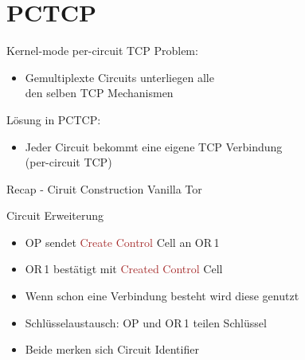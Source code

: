 \documentclass{beamer}
\begin{document}
\section{PCTCP}


\begin{frame}{Kernel-mode per-circuit TCP}{\secname}
  Problem:
  \begin{itemize}
    \item Gemultiplexte Circuits unterliegen alle\\ den selben TCP Mechanismen
  \end{itemize}
  Lösung in PCTCP:
  \begin{itemize}
    \item Jeder Circuit bekommt eine eigene TCP Verbindung\\(per-circuit TCP)
  \end{itemize}
\end{frame}


\begin{frame}{Recap - Ciruit Construction Vanilla Tor}{\secname}
  \begin{center}
  \end{center}

  \begin{block}{Circuit Erweiterung}
    \begin{itemize}
      \item OP sendet \textcolor{brown}{Create Control} Cell an OR\,1
      \item OR\,1 bestätigt mit \textcolor{brown}{Created Control} Cell
      \item {\color{red}Wenn schon eine Verbindung besteht wird diese genutzt}
      \item Schlüsselaustausch: OP und OR\,1 teilen Schlüssel
      \item Beide merken sich Circuit Identifier
    \end{itemize}
  \end{block}
\end{frame}
\end{document}
